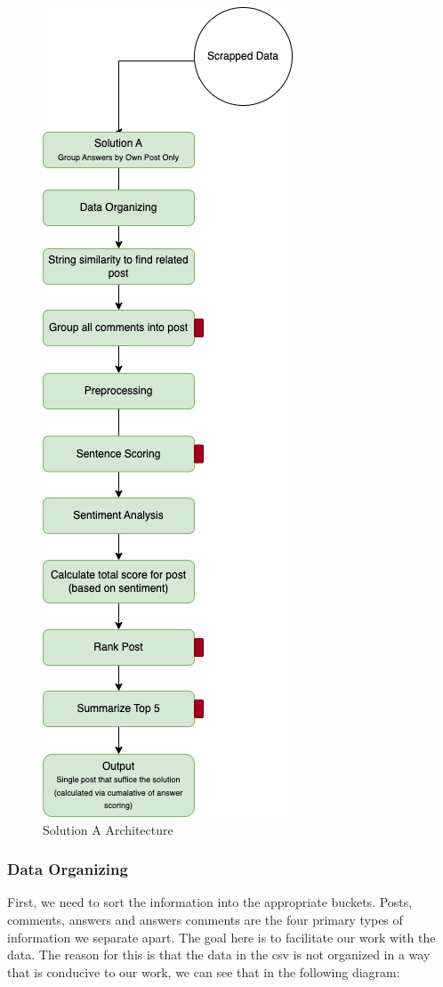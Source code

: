 \pagebreak
\begin{figure}[H]
  \centering
  \noindent \includegraphics[scale=0.75]{assets/solution-a.png}
\caption{Solution A Architecture }\label{solution_a_architecture}
\end{figure}

\subsubsection{Data Organizing} \label{data-organization}
First, we need to sort the information into the appropriate buckets. Posts, comments, answers and answers comments are the four primary types of information we separate apart. The goal here is to facilitate our work with the data. The reason for this is that the data in the csv is not organized in a way that is conducive to our work, we can see that in the following diagram:

